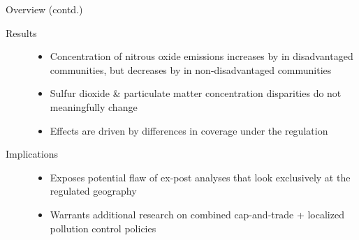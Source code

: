 \documentclass[11pt, aspectratio = 169]{beamer}
\begin{document}
\begin{frame}{Overview (contd.)}
    
\begin{description}
    \item[Results]\begin{itemize}
        \item Concentration of nitrous oxide emissions increases by  in disadvantaged communities, but decreases by in non-disadvantaged communities
        \item Sulfur dioxide \& particulate matter concentration disparities do not meaningfully change
        \item Effects are driven by differences in coverage under the regulation  
    \end{itemize}
    \vfill
    \item[Implications]\begin{itemize}
        \item Exposes potential flaw of ex-post analyses that look exclusively at the regulated geography
        \item Warrants additional research on combined cap-and-trade + localized pollution control policies
    \end{itemize}
\end{description}

\end{frame}


    



\end{document}
